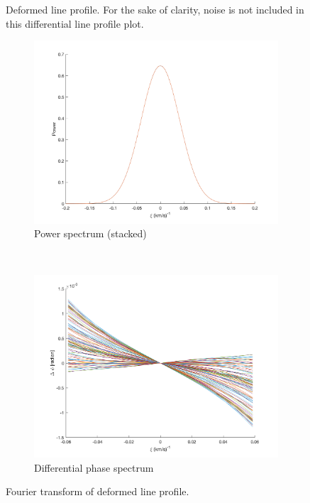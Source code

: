 \begin{figure}[tbp]
    \caption[Deformed line profile]{Deformed line profile. For the sake of clarity, noise is not included in  
    this differential line profile plot.}
\label{fig:line_profiles_deformation}
\end{figure}	

\begin{figure}[tbp]	
    \begin{subfigure}[b]{0.49\textwidth}
        \includegraphics[width=\textwidth]{./Figures/Methods/LPD2-FT_power.png}
        \caption{Power spectrum (stacked)}
    \end{subfigure}
	~
    \begin{subfigure}[b]{0.49\textwidth}
        \includegraphics[width=\textwidth]{./Figures/Methods/LPD4-Relative_phase_angle.png}
        \caption{Differential phase spectrum}
        \label{fig:dps_LPD}
    \end{subfigure}	
    
    \caption[Fourier transform of deformed line profile]{Fourier transform of deformed line profile.}
\label{fig:FT_process_LPD}
\end{figure}    

